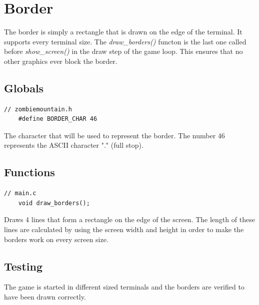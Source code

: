 \documentclass{article}
\begin{document}
\clearpage

\section{Border}
The border is simply a rectangle that is drawn on the edge of the terminal. It supports every terminal size.
\newline
The \emph{draw\_borders()} functon is the last one called before \emph{show\_screen()} in the draw step of the game loop. This ensures that no other graphics ever block the border. 

\subsection*{Globals}
\begin{lstlisting}[style=CStyle]
	// zombiemountain.h
	#define BORDER_CHAR	46
\end{lstlisting}
The character that will be used to represent the border. The number 46 represents the ASCII character "." (full stop).
\newline

\subsection*{Functions}
\begin{lstlisting}[style=CStyle]
	// main.c
	void draw_borders();
\end{lstlisting}
Draws 4 lines that form a rectangle on the edge of the screen. The length of these lines are calculated by using the screen width and height in order to make the borders work on every screen size.
\newline

\subsection*{Testing}
The game is started in different sized terminals and the borders are verified to have been drawn correctly.
\end{document}
